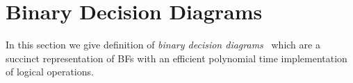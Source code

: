 \documentclass[
  digital, %
  twoside, %
  table,   %
  nolof,     %
  nolot,     %
]{fithesis3}
\let\setbuilder\set
\newcommand{\simpleset}[1]{\{{#1}\}}
\renewcommand{\set}[1]{\normalexpandarg\IfSubStr{#1}{|}{\setbuilder{#1}}{\simpleset{#1}}}
\newtheorem{theorem}{Theorem}[chapter] %
\theoremstyle{definition}
\theoremstyle{remark}
\newcommand{\seman}[1]{\left\llbracket {#1} \right\rrbracket}
\newcommand{\substitute}[2]{\left[ \nicefrac{#2}{#1} \right]}
\begin{document}


\section{Binary Decision Diagrams}
In this section we give definition of \emph{binary decision diagrams}~\cite{BDD} which are a succinct representation of BFs with an efficient polynomial time implementation of logical operations.
\end{document}
